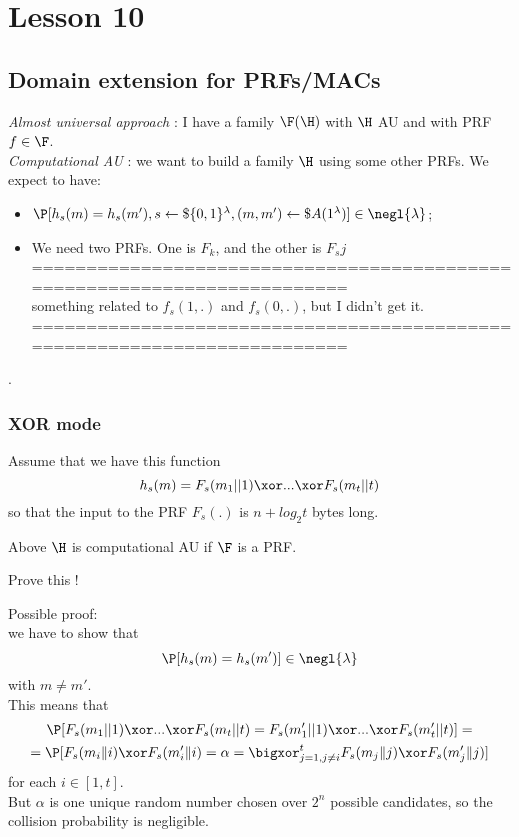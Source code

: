\chapter*{Lesson 10}
\section{Domain extension for PRFs/MACs}

\textit{Almost universal approach} : I have a family $\F(\H)$ with $\H$ AU and
with PRF $f \in \F$.\\

\textit{Computational AU} : we want to build a family $\H$ using some other
PRFs. We expect to have:
\begin{itemize}
    \item $ \P [ h_{s}(m)=h_{s}(m'), s\leftarrow\$\{0,1\}^{\lambda} , (m,
        m')\leftarrow\$A(1^{\lambda}) ] \in \negl{\lambda} $;
    \item We need two PRFs. One is $F_{k}$, and the other is $F_{s}j$\\
=========================================================================\\
something related to $f_{s}(1,.)$ and $f_{s}(0, . )$, but I didn't get it. \\
=========================================================================\\
\end{itemize}.

\subsection{XOR mode}
Assume that we have this function
\[
    h_{s}(m)=F_{s}(m_{1}||1) \xor ... \xor F_{s}(m_{t}||t)
\]
so that the input to the PRF $F_{s}(.)$ is $n + log_{2} t$ bytes long.
\begin{lemma}
    Above $\H$ is computational AU if $\F$ is a PRF.
\end{lemma}
\begin{exercise}
    Prove this !
\end{exercise}
Possible proof:\\

we have to show that
\[
    \P [ h_{s}(m)=h_{s}(m') ] \in \negl{\lambda}   
\]
with $m\not=m'$.\\
This means that 
    \begin{gather*}
        \P [F_{s}(m_{1}||1) \xor ... \xor F_{s}(m_{t}||t) = F_{s}(m'_{1}||1) \xor ...
        \xor F_{s}(m'_{t}||t)]  =\\
        = \P [ F_{s}(m_{i}\|i) \xor  F_{s}(m'_{i}\|i)= \alpha  = \bigxor_{j=1, j\not=i}^{t} 
        F_{s}(m_{j}\|j) \xor  F_{s}(m'_{j}\|j)]
    \end{gather*}
    for each $i \in [1,t]$.\\
    But $\alpha$ is one unique random number chosen over $2^{n}$ possible
    candidates, so the collision probability is negligible.\\
